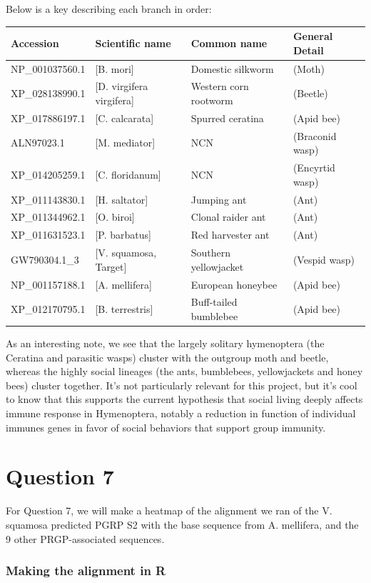 \documentclass[]{article}
\begin{document}
Below is a key describing each branch in order:

\begin{longtable}[]{@{}llll@{}}
\toprule
Accession & Scientific name & Common name & General
Detail\tabularnewline
\midrule
\endhead
NP\_001037560.1 & {[}B. mori{]} & Domestic silkworm &
(Moth)\tabularnewline
XP\_028138990.1 & {[}D. virgifera virgifera{]} & Western corn rootworm &
(Beetle)\tabularnewline
XP\_017886197.1 & {[}C. calcarata{]} & Spurred ceratina & (Apid
bee)\tabularnewline
ALN97023.1 & {[}M. mediator{]} & NCN & (Braconid wasp)\tabularnewline
XP\_014205259.1 & {[}C. floridanum{]} & NCN & (Encyrtid
wasp)\tabularnewline
XP\_011143830.1 & {[}H. saltator{]} & Jumping ant & (Ant)\tabularnewline
XP\_011344962.1 & {[}O. biroi{]} & Clonal raider ant &
(Ant)\tabularnewline
XP\_011631523.1 & {[}P. barbatus{]} & Red harvester ant &
(Ant)\tabularnewline
GW790304.1\_3 & {[}V. squamosa, Target{]} & Southern yellowjacket &
(Vespid wasp)\tabularnewline
NP\_001157188.1 & {[}A. mellifera{]} & European honeybee & (Apid
bee)\tabularnewline
XP\_012170795.1 & {[}B. terrestris{]} & Buff-tailed bumblebee & (Apid
bee)\tabularnewline
\bottomrule
\end{longtable}

As an interesting note, we see that the largely solitary hymenoptera
(the Ceratina and parasitic wasps) cluster with the outgroup moth and
beetle, whereas the highly social lineages (the ants, bumblebees,
yellowjackets and honey bees) cluster together. It's not particularly
relevant for this project, but it's cool to know that this supports the
current hypothesis that social living deeply affects immune response in
Hymenoptera, notably a reduction in function of individual immunes genes
in favor of social behaviors that support group immunity.

\section{Question 7}\label{question-7}

For Question 7, we will make a heatmap of the alignment we ran of the V.
squamosa predicted PGRP S2 with the base sequence from A. mellifera, and
the 9 other PRGP-associated sequences.

\subsubsection{Making the alignment in
R}\label{making-the-alignment-in-r}
\end{document}
